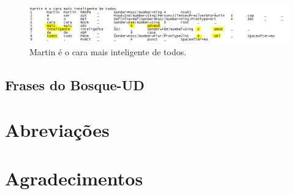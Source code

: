 \documentclass[output=paper,colorlinks,citecolor=brown]{langscibook}
\begin{document}
\begin{figure}
    \centering
    \includegraphics[width=\textwidth,height=\textheight,keepaspectratio]{imagesDrive/image27.png}
    \caption{Martin é o cara mais inteligente de todos.}
    \label{fig:comparative2}
\end{figure}{}

\subsection{Frases do Bosque-UD}



\section*{Abreviações}
\section*{Agradecimentos}

\printbibliography[heading=subbibliography,notkeyword=this]
\end{document}
